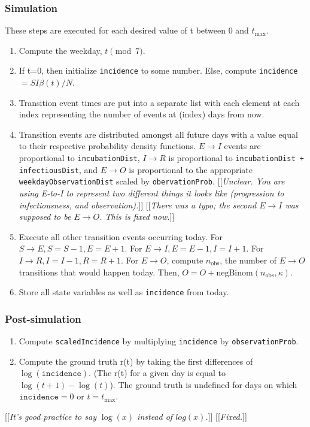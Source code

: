\documentclass{article}
\newcommand{\code}[1]{\texttt{#1}}
\newcommand{\jd}[1]{[[\textsl{#1}]]} %
\newcommand{\msComment}[1]{[[\textsl{#1}]]}
\begin{document}
\subsubsection{Simulation}
These steps are executed for each desired value of t between 0 and $t_{\mathrm{max}}$.
\begin{enumerate}
    
    \item Compute the weekday, $t \pmod 7$.
    
    \item If t=0, then initialize \code{incidence} to some number. Else, compute \code{incidence} $= SI\beta(t)/N$.
    
    \item Transition event times are put into a separate list with each element at each index representing the number of events at (index) days from now. 

    \item Transition events are distributed amongst all future days with a value equal to their respective probability density functions. $E \rightarrow I$ events are proportional to \code{incubationDist}, $I \rightarrow R$ is proportional to \code{incubationDist + infectiousDist}, and $E \rightarrow O$ is proportional to the appropriate \linebreak \code{weekdayObservationDist} scaled by \code{obervationProb}.
	 \jd{Unclear. You are using E-to-I to represent two different things it looks like (progression to infectiousness, and observation).} \msComment{There was a typo; the second $E \rightarrow I$ was supposed to be $E \rightarrow O$. This is fixed now.}

    \item Execute all other transition events occurring today. For $S \rightarrow E, S=S-1, E=E+1$. For $E \rightarrow I, E=E-1, I=I+1$. For $I \rightarrow R, I = I-1, R = R+1$. For $E \rightarrow O$, compute $n_{\mathrm{obs}}$, the number of $E \rightarrow O$ transitions that would happen today. Then, $O = O + \mathrm{negBinom}(n_{\mathrm{obs}}, \kappa)$.    
    
    \item Store all state variables as well as \code{incidence} from today.
    
\end{enumerate}

\subsubsection{Post-simulation}
\begin{enumerate}
    \item Compute \code{scaledIncidence} by multiplying \code{incidence} by \code{observationProb}.
    \item Compute the ground truth r(t) by taking the first differences of $\log(\code{incidence})$. (The r(t) for a given day is equal to $\log(t+1) - \log(t)$). The ground truth is undefined for days on which $\code{incidence}=0$ or $t=t_{\mathrm{max}}$. 
\end{enumerate}
\jd{It's good practice to say $\log(x)$ instead of $log(x)$.} \msComment{Fixed.}
\end{document}

